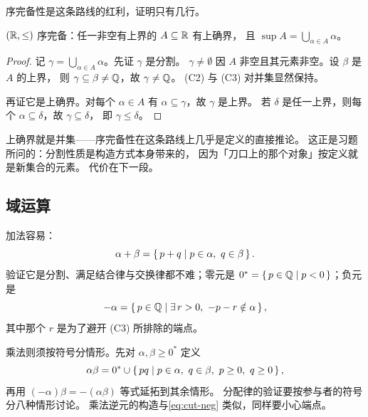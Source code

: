 序完备性是这条路线的红利，证明只有几行。

\begin{theorem}
  \label{thm:cut-complete}
  \((\mathbb{R}, \le)\) 序完备：任一非空有上界的 \(A \subseteq \mathbb{R}\) 有上确界，
  且 \(\sup A = \bigcup_{\alpha \in A} \alpha\)。
\end{theorem}

\begin{proof}
  记 \(\gamma = \bigcup_{\alpha \in A}\alpha\)。先证 \(\gamma\) 是分割。
  \(\gamma \neq \emptyset\) 因 \(A\) 非空且其元素非空。设 \(\beta\) 是 \(A\) 的上界，
  则 \(\gamma \subseteq \beta \neq \mathbb{Q}\)，故 \(\gamma \neq \mathbb{Q}\)。
  (C2) 与 (C3) 对并集显然保持。

  再证它是上确界。对每个 \(\alpha \in A\) 有 \(\alpha \subseteq \gamma\)，故 \(\gamma\) 是上界。
  若 \(\delta\) 是任一上界，则每个 \(\alpha \subseteq \delta\)，故 \(\gamma \subseteq \delta\)，
  即 \(\gamma \le \delta\)。
\end{proof}

\begin{remark}
  上确界就是并集——序完备性在这条路线上几乎是定义的直接推论。
  这正是习题所问的：分割性质是构造方式本身带来的，
  因为「刀口上的那个对象」按定义就是新集合的元素。
  代价在下一段。
\end{remark}

\subsection*{域运算}

加法容易：
\begin{equation}
  \label{eq:cut-add}
  \alpha + \beta = \left\{\,p + q \;\middle|\; p \in \alpha,\ q \in \beta\,\right\}.
\end{equation}
验证它是分割、满足结合律与交换律都不难；零元是
\(0^{*} = \left\{\,p \in \mathbb{Q} \;\middle|\; p < 0\,\right\}\)；负元是
\begin{equation}
  \label{eq:cut-neg}
  -\alpha = \left\{\,p \in \mathbb{Q} \;\middle|\; \exists\, r > 0,\ -p - r \notin \alpha\,\right\},
\end{equation}
其中那个 \(r\) 是为了避开 (C3) 所排除的端点。

乘法则须按符号分情形。先对 \(\alpha, \beta \ge 0^{*}\) 定义
\begin{equation}
  \label{eq:cut-mult}
  \alpha\beta = 0^{*} \cup \left\{\,pq \;\middle|\; p \in \alpha,\ q \in \beta,\ p \ge 0,\ q \ge 0\,\right\},
\end{equation}
再用 \((-\alpha)\beta = -(\alpha\beta)\) 等式延拓到其余情形。
分配律的验证要按参与者的符号分八种情形讨论。
乘法逆元的构造与\cref{eq:cut-neg} 类似，同样要小心端点。

